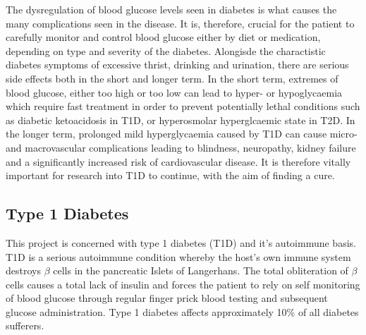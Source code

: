 {The dysregulation of blood glucose levels seen in diabetes is what causes the many complications seen in the disease.
It is, therefore, crucial for the patient to carefully monitor and control blood glucose either by diet or medication, depending on type and severity of the diabetes.
Alongisde the charactistic diabetes symptoms of excessive thrist, drinking and urination, there are serious side effects both in the short and longer term.
In the short term, extremes of blood glucose, either too high or too low can lead to hyper- or hypoglycaemia which require fast treatment in order to prevent potentially lethal conditions such as diabetic ketoacidosis in T1D, or hyperosmolar hyperglcaemic state in T2D.
In the longer term, prolonged mild hyperglycaemia caused by T1D can cause micro- and macrovascular complications leading to blindness, neuropathy, kidney failure and a significantly increased risk of cardiovascular disease\citep{OxClinMed}.
It is therefore vitally important for research into T1D to continue, with the aim of finding a cure.

\subsection{Type 1 Diabetes}

This project is concerned with type 1 diabetes (T1D) and it's autoimmune basis.
T1D is a serious autoimmune condition whereby the host's own immune system destroys $\beta$ cells in the pancreatic Islets of Langerhans.
The total obliteration of $\beta$ cells causes a total lack of insulin and forces the patient to rely on self monitoring of blood glucose through regular finger prick blood testing and subsequent glucose administration.
Type 1 diabetes affects approximately 10\% of all diabetes sufferers.}






